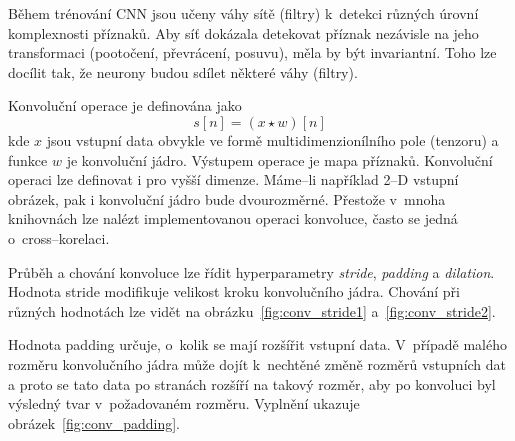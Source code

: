 Během trénování CNN jsou učeny váhy sítě (filtry) k~detekci různých úrovní komplexnosti příznaků. Aby síť dokázala detekovat příznak nezávisle na jeho transformaci (pootočení, převrácení, posuvu), měla by být invariantní. Toho lze docílit tak, že neurony budou sdílet některé váhy (filtry).


Konvoluční operace je definována jako
\begin{equation}
   s[n] = (x \star w)[n]
\end{equation}
kde $x$ jsou vstupní data obvykle ve formě multidimenzionílního pole (tenzoru) a funkce $w$ je konvoluční jádro. Výstupem operace je mapa příznaků. Konvoluční operaci lze definovat i pro vyšší dimenze. Máme--li například 2--D vstupní obrázek, pak i konvoluční jádro bude dvourozměrné. Přestože v~mnoha knihovnách lze nalézt implementovanou operaci konvoluce, často se jedná o~cross--korelaci.


Průběh a chování konvoluce lze řídit hyperparametry \textit{stride}, \textit{padding} a \textit{dilation}. Hodnota stride modifikuje velikost kroku konvolučního jádra. Chování při různých hodnotách lze vidět na obrázku~\ref{fig:conv_stride1} a~\ref{fig:conv_stride2}. 

Hodnota padding určuje, o~kolik se mají rozšířit vstupní data. V~případě malého rozměru konvolučního jádra může dojít k~nechtěné změně rozměrů vstupních dat a proto se tato data po stranách rozšíří na takový rozměr, aby po konvoluci byl výsledný tvar v~požadovaném rozměru. Vyplnění ukazuje obrázek~\ref{fig:conv_padding}.


%

